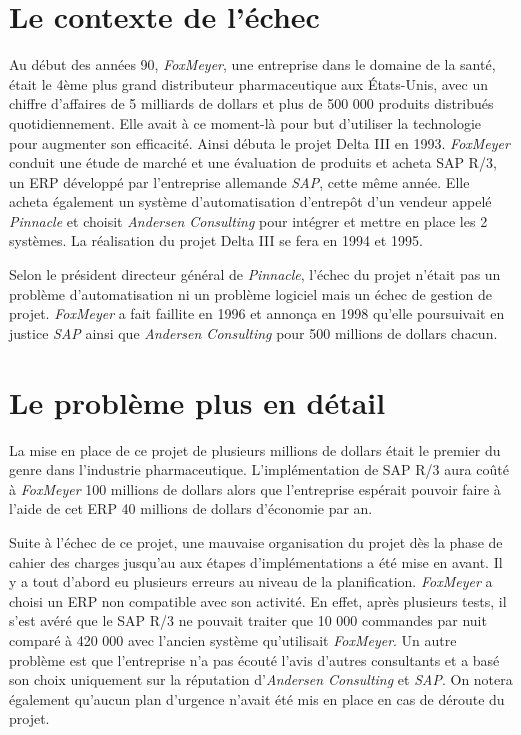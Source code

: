 \documentclass[12pt]{report}
\begin{document}
\section{Le contexte de l'échec}

Au début des années 90, \textit{FoxMeyer}, une entreprise dans le domaine de la santé, était le 4ème plus grand distributeur pharmaceutique aux États-Unis, avec un chiffre d’affaires de 5 milliards de dollars et plus de 500 000 produits distribués quotidiennement\cite{exoplatfoxmeyer}. Elle avait à ce moment-là pour but d’utiliser la technologie pour augmenter son efficacité. Ainsi débuta le projet Delta III en 1993.
\textit{FoxMeyer} conduit une étude de marché et une évaluation de produits et acheta SAP R/3, un ERP développé par l’entreprise allemande \textit{SAP}, cette même année.
Elle acheta également un système d’automatisation d’entrepôt d’un vendeur appelé \textit{Pinnacle} et choisit \textit{Andersen Consulting} pour intégrer et mettre en place les 2 systèmes. La réalisation du projet Delta III se fera en 1994 et 1995.

Selon le président directeur général de \textit{Pinnacle}, l’échec du projet n’était pas un problème d’automatisation ni un problème logiciel mais un échec de gestion de projet.
\textit{FoxMeyer} a fait faillite en 1996 et annonça en 1998 qu’elle poursuivait en justice \textit{SAP} ainsi que \textit{Andersen Consulting} pour 500 millions de dollars chacun\cite{zimmerfoxmeyer}.

\section{Le problème plus en détail}

La mise en place de ce projet de plusieurs millions de dollars était le premier du genre dans l’industrie pharmaceutique. L’implémentation de SAP R/3 aura coûté à \textit{FoxMeyer} 100 millions de dollars alors que l’entreprise espérait pouvoir faire à l’aide de cet ERP 40 millions de dollars d’économie par an.

Suite à l’échec de ce projet, une mauvaise organisation du projet dès la phase de cahier des charges jusqu’au aux étapes d’implémentations a été mise en avant\cite{zimmerfoxmeyer}.
Il y a tout d’abord eu plusieurs erreurs au niveau de la planification. \textit{FoxMeyer} a choisi un ERP non compatible avec son activité. En effet, après plusieurs tests, il s’est avéré que le SAP R/3 ne pouvait traiter que 10 000 commandes par nuit comparé à 420 000 avec l’ancien système qu'utilisait \textit{FoxMeyer}. Un autre problème est que l’entreprise n’a pas écouté l’avis d’autres consultants et a basé son choix uniquement sur la réputation d'\textit{Andersen Consulting} et \textit{SAP}. On notera également qu’aucun plan d’urgence n’avait été mis en place en cas de déroute du projet.
\end{document}

